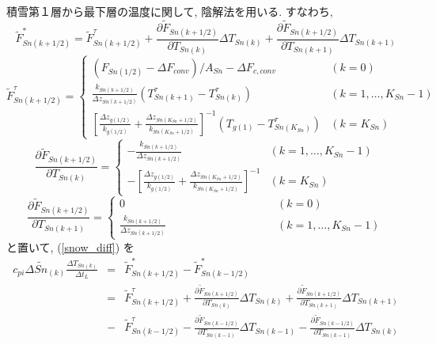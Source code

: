 積雪第１層から最下層の温度に関して, 陰解法を用いる. 
すなわち, 
\begin{equation}
 \widetilde{F}_{Sn(k+1/2)}^* = \widetilde{F}_{Sn(k+1/2)}^{\tau}  
+\frac{\partial \widetilde{F}_{Sn(k+1/2)}}{\partial T_{Sn(k)}} 
 \Delta T_{Sn(k)}
+\frac{\partial \widetilde{F}_{Sn(k+1/2)}}{\partial T_{Sn(k+1)}} 
 \Delta T_{Sn(k+1)}
\end{equation}
\begin{equation}
 \widetilde{F}_{Sn(k+1/2)}^{\tau} =
\left\{
\begin{array}{ll}
( F_{Sn(1/2)} - \Delta F_{conv})/A_{Sn} - \Delta F_{c,conv} 
& (k=0)\\
\displaystyle{
\frac{k_{Sn(k+1/2)}}{\Delta z_{Sn(k+1/2)}} (T_{Sn(k+1)}^{\tau} - T_{Sn(k)}^{\tau})
}
& (k=1,\ldots,K_{Sn}-1) \\
\displaystyle{
\left[\frac{\Delta z_{g(1/2)}}{k_{g(1/2)}}
+\frac{\Delta z_{Sn(K_{Sn}+1/2)}}{k_{Sn(K_{Sn}+1/2)}}
\right]^{-1}
(T_{g(1)} - T_{Sn(K_{Sn})}^{\tau})
}
& (k=K_{Sn})
\end{array}
\right. 
\end{equation}
\begin{equation}
 \frac{\partial \widetilde{F}_{Sn(k+1/2)}}{\partial T_{Sn(k)}} =
\left\{
\begin{array}{ll}
\displaystyle{
- \frac{k_{Sn(k+1/2)}}{\Delta z_{Sn(k+1/2)}} 
}
& (k=1,\ldots,K_{Sn}-1) \\
\displaystyle{
- \left[\frac{\Delta z_{g(1/2)}}{k_{g(1/2)}}
+\frac{\Delta z_{Sn(K_{Sn}+1/2)}}{k_{Sn(K_{Sn}+1/2)}}
\right]^{-1}
}
& (k=K_{Sn})
\end{array}
\right. 
\end{equation}
\begin{equation}
 \frac{\partial \widetilde{F}_{Sn(k+1/2)}}{\partial T_{Sn(k+1)}} =
\left\{
\begin{array}{ll}
0 & \ \quad \qquad \qquad \qquad \qquad (k=0) \\
\displaystyle{
\frac{k_{Sn(k+1/2)}}{\Delta z_{Sn(k+1/2)}} 
}
  & \ \quad \qquad \qquad \qquad \qquad (k=1,\ldots,K_{Sn}-1) 
\end{array}
\right. 
\end{equation}
と置いて, (\ref{snow_diff}) を
\begin{eqnarray}
c_{pi}\Delta \widetilde{Sn}_{(k)} \frac{\Delta T_{Sn(k)}}{\Delta t_L} 
&=& \widetilde{F}_{Sn(k+1/2)}^* - \widetilde{F}_{Sn(k-1/2)}^* \nonumber \\
&=& \widetilde{F}_{Sn(k+1/2)}^{\tau} 
+\frac{\partial \widetilde{F}_{Sn(k+1/2)}}{\partial T_{Sn(k)}} 
 \Delta T_{Sn(k)}
+\frac{\partial \widetilde{F}_{Sn(k+1/2)}}{\partial T_{Sn(k+1)}} 
 \Delta T_{Sn(k+1)} \nonumber \\
&-& \widetilde{F}_{Sn(k-1/2)}^{\tau}
-\frac{\partial \widetilde{F}_{Sn(k-1/2)}}{\partial T_{Sn(k-1)}} 
 \Delta T_{Sn(k-1)}
-\frac{\partial \widetilde{F}_{Sn(k-1/2)}}{\partial T_{Sn(k-1)}} 
 \Delta T_{Sn(k)}
\end{eqnarray}

